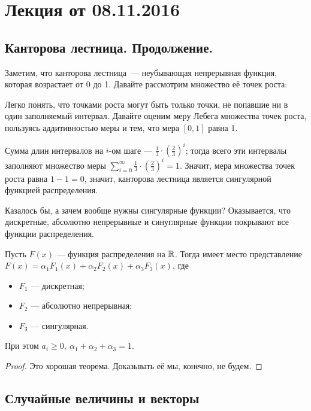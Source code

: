 \section{Лекция от 08.11.2016}

\subsection{Канторова лестница. Продолжение.}
Заметим, что канторова лестница~--- неубывающая непрерывная функция, которая возрастает от 0 до 1. Давайте рассмотрим множество её точек роста:

Легко понять, что точками роста могут быть только точки, не попавшие ни в один заполняемый интервал. Давайте оценим меру Лебега множества точек роста, пользуясь аддитивностью меры и тем, что мера $[0, 1]$ равна 1.

Сумма длин интервалов на $i$-ом шаге --- $\frac{1}{3}\cdot\left(\frac{2}{3}\right)^i$; тогда всего
эти интервалы заполняют множество меры
$\sum\limits_{i = 0}^{\infty}\frac{1}{3}\cdot\left(\frac{2}{3}\right)^i = 1$. Значит, мера множества точек
роста равна $1-1 = 0$, значит, канторова лестница является сингулярной функцией распределения.

Казалось бы, а зачем вообще нужны сингулярные функции? Оказывается, что дискретные, абсолютно непрерывные и синуглярные функции покрывают все функции распределения.

\begin{theorem}[Лебег]
    Пусть $F(x)$ --- функция распределения на $\mathbb{R}$. Тогда имеет место представление
    $F(x) = \alpha_1 F_1(x) + \alpha_2 F_2(x) + \alpha_3 F_3(x)$, где
    \begin{itemize}
        \item $F_1$ --- дискретная;
        \item $F_2$ --- абсолютно непрерывная;
        \item $F_3$ --- сингулярная.
    \end{itemize}

    При этом $a_i \geq 0,\ \alpha_1 + \alpha_2 + \alpha_3 = 1$.
\end{theorem}

\begin{proof}
    Это хорошая теорема. Доказывать её мы, конечно, не будем.
\end{proof}

\subsection{Случайные величины и векторы}

